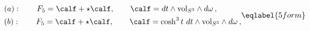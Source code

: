\begin{equation}
\begin{split}
&(a):\qquad F_5=\calf+\star\calf,\qquad 
\calf=dt\wedge {\rm vol}_{S^3}\wedge d\omega\,,
\\
&(b):\qquad F_5=\calf+\star\calf,\qquad 
\calf=\cosh^3 t\ dt\wedge {\rm vol}_{S^3}\wedge d\omega\,,
\end{split}
\eqlabel{5form}
\end{equation}

